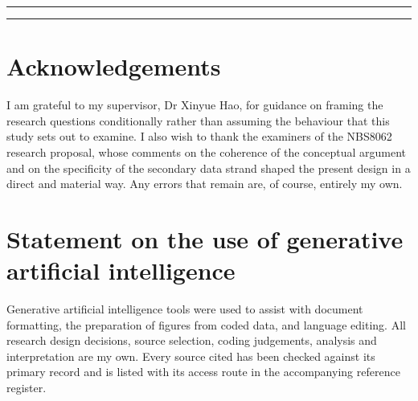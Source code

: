 \documentclass[11pt,a4paper]{article}
\numberwithin{figure}{section}
\numberwithin{table}{section}
\begin{document}
\vspace{8pt}
\rule{\textwidth}{0.5pt}
\vspace{4pt}


\vspace{10pt}
\rule{\textwidth}{0.8pt}

\newpage
\section*{Acknowledgements}

I am grateful to my supervisor, Dr Xinyue Hao, for guidance on framing the research questions
conditionally rather than assuming the behaviour that this study sets out to examine. I also wish to
thank the examiners of the NBS8062 research proposal, whose comments on the coherence of the conceptual
argument and on the specificity of the secondary data strand shaped the present design in a direct and
material way. Any errors that remain are, of course, entirely my own.

\vspace{6pt}
\section*{Statement on the use of generative artificial intelligence}

Generative artificial intelligence tools were used to assist with document formatting, the preparation of
figures from coded data, and language editing. All research design decisions, source selection, coding
judgements, analysis and interpretation are my own. Every source cited has been checked against its
primary record and is listed with its access route in the accompanying reference register.

\newpage
\setcounter{tocdepth}{2}
\tableofcontents
\vspace{10pt}
\listoffigures
\vspace{10pt}
\listoftables

\vspace{12pt}
\end{document}
